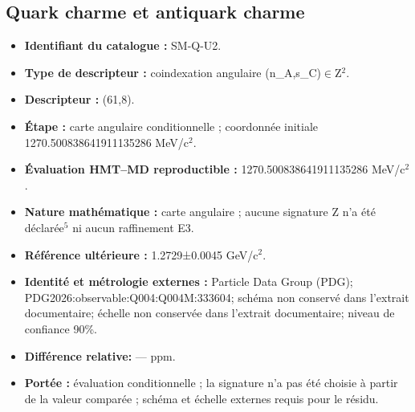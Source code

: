 \subsection{Quark charme et antiquark charme}
\begin{itemize}
\item \textbf{Identifiant du catalogue :} SM-Q-U2.
\item \textbf{Type de descripteur :} coindexation angulaire (n\_A,s\_C)\(\in\)Z\({}^{2}\).
\item \textbf{Descripteur :} (61,8).
\item \textbf{Étape :} carte angulaire conditionnelle ; coordonnée initiale 1270.500838\allowbreak{}641911\allowbreak{}135286 MeV/c\({}^{2}\).
\item \textbf{Évaluation HMT--MD reproductible :} 1270.500838\allowbreak{}641911\allowbreak{}135286 MeV/c\({}^{2}\).
\item \textbf{Nature mathématique :} carte angulaire ; aucune signature Z n’a été déclarée\({}^{5}\) ni aucun raffinement E3.
\item \textbf{Référence ultérieure :} 1.2729±\allowbreak{}0.0045 GeV/c\({}^{2}\).
\item \textbf{Identité et métrologie externes :} Particle Data Group (PDG); PDG2026:\allowbreak{}observable:\allowbreak{}Q004:\allowbreak{}Q004M:\allowbreak{}333604; schéma non conservé dans l’extrait documentaire; échelle non conservée dans l’extrait documentaire; niveau de confiance 90\%.
\item \textbf{Différence relative:} --- ppm.
\item \textbf{Portée :} évaluation conditionnelle ; la signature n’a pas été choisie à partir de la valeur comparée ; schéma et échelle externes requis pour le résidu.
\end{itemize}
